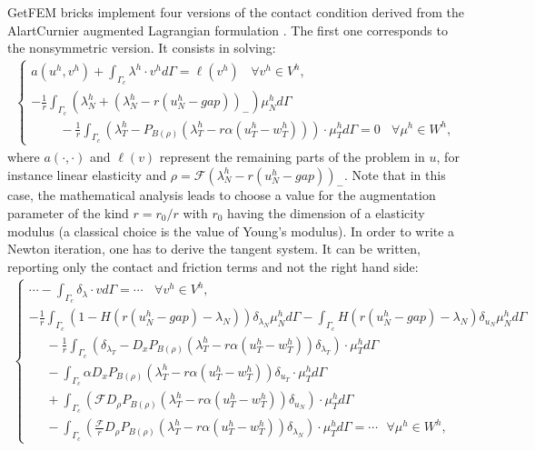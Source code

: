 \documentclass[a4paper,11pt,english]{sphinxmanual}
\begin{document}
GetFEM bricks implement four versions of the contact condition derived from the Alart\sphinxhyphen{}Curnier augmented Lagrangian formulation . The first one corresponds to the non\sphinxhyphen{}symmetric version. It consists in solving:
\begin{equation*}
\begin{split}\left\{\begin{array}{l}
a(u^h, v^h) + \displaystyle \int_{\Gamma_c} \lambda^h \cdot v^h d\Gamma = \ell(v^h) ~~~~ \forall v^h \in V^h, \\
\displaystyle -\frac{1}{r}\int_{\Gamma_c} (\lambda^h_N + (\lambda^h_N - r(u^h_N-gap))_-)\mu^h_N d\Gamma \\
~~~~~~~~~~\displaystyle -\frac{1}{r}\int_{\Gamma_c} (\lambda^h_T -P_{B(\rho)}(\lambda^h_T - r\alpha(u^h_T-w^h_T)))\cdot \mu^h_T d\Gamma = 0 ~~~~ \forall \mu^h \in W^h,
\end{array}\right.\end{split}
\end{equation*}
where \(a(\cdot, \cdot)\) and \(\ell(v)\) represent the remaining parts of the problem in  \(u\), for instance linear elasticity and \(\rho={\mathscr F}(\lambda^h_N - r(u^h_N-gap))_-\). Note that in this case, the mathematical analysis leads to choose a value for the augmentation parameter of the kind \(r = r_0 / r\) with \(r_0\) having the dimension of a elasticity modulus (a classical choice is the value of Young’s modulus). In order to write a Newton iteration, one has to derive the tangent system. It can be written, reporting only the contact and friction terms and not the right hand side:
\begin{equation*}
\begin{split}\left\{\begin{array}{l}
\cdots - \displaystyle \int_{\Gamma_c} \delta_{\lambda} \cdot v d\Gamma = \cdots  ~~~~ \forall v^h \in V^h, \\
\displaystyle -\frac{1}{r}\int_{\Gamma_c}(1-H(r(u^h_N-gap)-\lambda_N))\delta_{\lambda_N}\mu^h_N d\Gamma
\displaystyle -\int_{\Gamma_c}H(r(u^h_N-gap)-\lambda_N)\delta_{u_N}\mu^h_N d\Gamma \\
~~~~~~\displaystyle -\frac{1}{r}\int_{\Gamma_c}(\delta_{\lambda_T} - D_xP_{B(\rho)}(\lambda^h_T - r\alpha(u^h_T-w^h_T))\delta_{\lambda_T})\cdot\mu^h_T d\Gamma \\
~~~~~~\displaystyle -\int_{\Gamma_c}\alpha D_xP_{B(\rho)}(\lambda^h_T - r\alpha(u^h_T-w^h_T))\delta_{u_T}\cdot\mu^h_T d\Gamma \\
~~~~~~ \displaystyle +\int_{\Gamma_c}({\mathscr F} D_{\rho}P_{B(\rho)}(\lambda^h_T - r\alpha(u^h_T-w^h_T))\delta_{u_N})\cdot\mu^h_T d\Gamma \\
~~~~~~ \displaystyle -\int_{\Gamma_c}(\frac{\mathscr F}{r} D_{\rho}P_{B(\rho)}(\lambda^h_T - r\alpha(u^h_T-w^h_T))\delta_{\lambda_N})\cdot\mu^h_T d\Gamma = \cdots ~~~ \forall \mu^h \in W^h,
\end{array}\right.\end{split}
\end{equation*}
\end{document}
